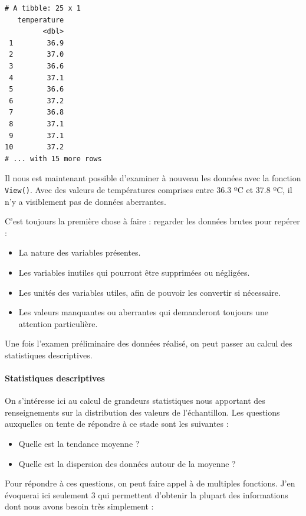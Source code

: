 \documentclass[
  a4paper,
]{article}
\providecommand{\tightlist}{%
  \setlength{\itemsep}{0pt}\setlength{\parskip}{0pt}}
\begin{document}
\begin{verbatim}
# A tibble: 25 x 1
   temperature
         <dbl>
 1        36.9
 2        37.0
 3        36.6
 4        37.1
 5        36.6
 6        37.2
 7        36.8
 8        37.1
 9        37.1
10        37.2
# ... with 15 more rows
\end{verbatim}

Il nous est maintenant possible d'examiner à nouveau les données avec la fonction \texttt{View()}. Avec des valeurs de températures comprises entre 36.3 ºC et 37.8 ºC, il n'y a visiblement pas de données aberrantes.

C'est toujours la première chose à faire : regarder les données brutes pour repérer :

\begin{itemize}
\tightlist
\item
  La nature des variables présentes.
\item
  Les variables inutiles qui pourront être supprimées ou négligées.
\item
  Les unités des variables utiles, afin de pouvoir les convertir si nécessaire.
\item
  Les valeurs manquantes ou aberrantes qui demanderont toujours une attention particulière.
\end{itemize}

Une fois l'examen préliminaire des données réalisé, on peut passer au calcul des statistiques descriptives.

\hypertarget{statistiques-descriptives}{%
\paragraph{Statistiques descriptives}\label{statistiques-descriptives}}

On s'intéresse ici au calcul de grandeurs statistiques nous apportant des renseignements sur la distribution des valeurs de l'échantillon. Les questions auxquelles on tente de répondre à ce stade sont les suivantes :

\begin{itemize}
\tightlist
\item
  Quelle est la tendance moyenne ?
\item
  Quelle est la dispersion des données autour de la moyenne ?
\end{itemize}

Pour répondre à ces questions, on peut faire appel à de multiples fonctions. J'en évoquerai ici seulement 3 qui permettent d'obtenir la plupart des informations dont nous avons besoin très simplement :
\end{document}

